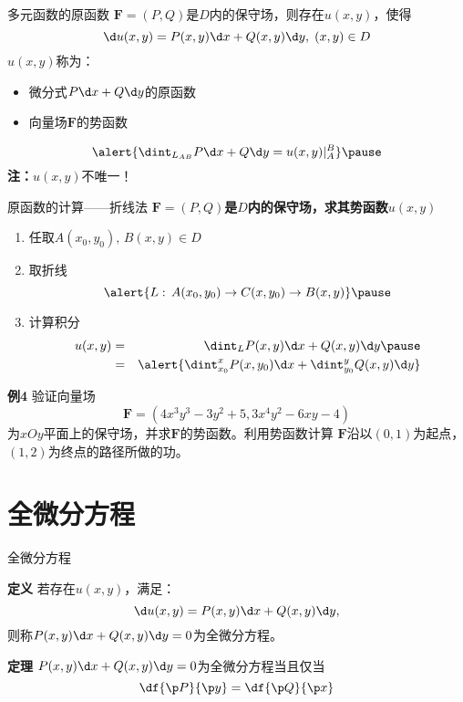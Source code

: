 \begin{frame}{多元函数的原函数}
	\linespread{1.2}
	$\bm{F}=(P,Q)$是$D$内的保守场，则存在$u(x,y)$，使得
	$$\d u(x,y)=P(x,y)\d x+Q(x,y)\d y,\;(x,y)\in D$$
	\pause $u(x,y)$称为：\pause 
	\begin{itemize}
	  \item {\bb 微分式$P\d x+Q\d y$的原函数}\pause 
	  \item {\bb 向量场$\bm{F}$的势函数}\pause 
	\end{itemize}
	\bigskip
	$$\alert{\dint_{L_{AB}}P\d x+Q\d y=u(x,y)|_A^B}\pause $$
	{\bf 注：}$u(x,y)$不唯一！
\end{frame}

\begin{frame}{原函数的计算——折线法}
	\linespread{1.2}\pause 
	{\bf $\bm{F}=(P,Q)$是$D$内的保守场，求其势函数$u(x,y)$}\pause 
	\begin{enumerate}
	  \item 任取$A(x_0,y_0),\,B(x,y)\in D$\pause 
	  \item 取折线
	  $$\alert{L:\,A(x_0,y_0)\to C(x,y_0)\to B(x,y)}\pause $$
	  \vspace{-1em}
	  \item 计算积分
	  \begin{eqnarray*}
	  	u(x,y)&=&\dint_LP(x,y)\d x+Q(x,y)\d y\pause \\
	  	&=&\alert{\dint_{x_0}^xP(x,y_0)\d x+\dint_{y_0}^yQ(x,y)\d y}
	  \end{eqnarray*}
	\end{enumerate}
\end{frame}

\begin{frame}
	\linespread{1.2}
	\begin{exampleblock}{{\bf 例4}\hfill}
		验证向量场
		$$\bm{F}=(4x^3y^3-3y^2+5,3x^4y^2-6xy-4)$$
		为$xOy$平面上的保守场，并求$\bm{F}$的势函数。利用势函数计算
		$\bm{F}$沿以$(0,1)$为起点，$(1,2)$为终点的路径所做的功。
	\end{exampleblock}
\end{frame}

\section{全微分方程}

\begin{frame}{全微分方程}
	\linespread{1.2}
	\begin{block}{{\bf 定义}\hfill}
		若存在$u(x,y)$，满足：
		$$\d u(x,y)=P(x,y)\d x+Q(x,y)\d y,$$
		则称{\bb $P(x,y)\d x+Q(x,y)\d y=0$为全微分方程}。\pause
	\end{block}
	\begin{block}{{\bf 定理}\hfill}
		$P(x,y)\d x+Q(x,y)\d y=0$为全微分方程当且仅当
		$$\df{\p P}{\p y}=\df{\p Q}{\p x}$$
	\end{block}
\end{frame}

